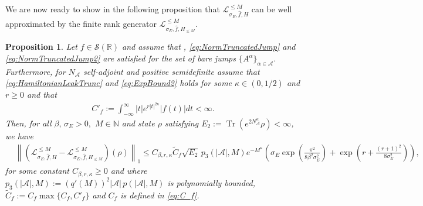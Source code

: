 \documentclass[11pt]{amsart}
\newcommand{\nn}{\nonumber}
\newcommand{\1}{\mathbbm{1}}
\newcommand{\Tr}{\operatorname{Tr}}
\newcommand{\N}{\mathbb{N}}
\newcommand{\NA}{N_{\mathcal{A}}}
\newcommand{\cA}{\mathcal{A}}
\theoremstyle{plain}
\newtheorem{proposition}[theorem]{Proposition}
\theoremstyle{definition}
\theoremstyle{remark}
\numberwithin{equation}{section}
\begin{document}
\noindent  We are now ready to show in the following proposition that $\mathcal{L}^{\le M}_{\sigma_E,\widehat{f},H}$ can be well approximated by the finite rank generator $\mathcal{L}^{\le M}_{\sigma_E,\widehat{f},H_{\le M}}.$ 
\begin{proposition}\label{prop:generatorboungFullyFinite}
Let $f\in\mathcal{S}(\mathbb{R})$ and assume that , \eqref{eq:NormTruncatedJump} and \eqref{eq:NormTruncatedJump2} are satisfied for the set of bare jumps $\{A^\alpha\}_{\alpha\in\cA}$. Furthermore, for $\NA$ self-adjoint and positive semidefinite assume that \eqref{eq:HamiltonianLeakTrunc} and  \eqref{eq:ExpBound2} holds for some $\kappa\in(0,1/2)$ and $r\ge0$ and that
\begin{align*}
    C'_f := \int_{-\infty}^{\infty} |t|e^{r|t|^{2\kappa}} |f(t)|dt < \infty.
\end{align*}
Then, for all $\beta,\,\sigma_E>0,$ $M\in\N$ and state $\rho$ satisfying $E_2:=\Tr(e^{2\NA^{\kappa}}\rho)<\infty$, we have
\begin{align}
&\nn\left\|(\mathcal{L}^{\le M}_{\sigma_E,\widehat{f},H}-\mathcal{L}^{\le M}_{\sigma_E,\widehat{f},H_{\le M}})(\rho)\right\|_1\le  C_{\beta,r,\kappa} \widetilde C_f \sqrt{E_2}\,p_3(|\cA|,M)e^{-M^{\kappa}}\nn\left(\sigma_E
\exp\!\left(\tfrac{\pi^2}{8\beta^2\sigma_E^2}\right)+\exp\left(r+\tfrac{(r+1)^2}{8\sigma^2_E}\right)\right),
\end{align}
for some constant $C_{\beta,r,\kappa}\ge 0$ and 
where $p_3(|\cA|,M):=(q'(M))^2|\cA|\,p(|\cA|,M)$ is  polynomially bounded, $\widetilde C_f := C_f\max\{C_f,C'_f\}$ and $C_f$ is defined in \eqref{eq:C_f}.
\end{proposition}
\end{document}
